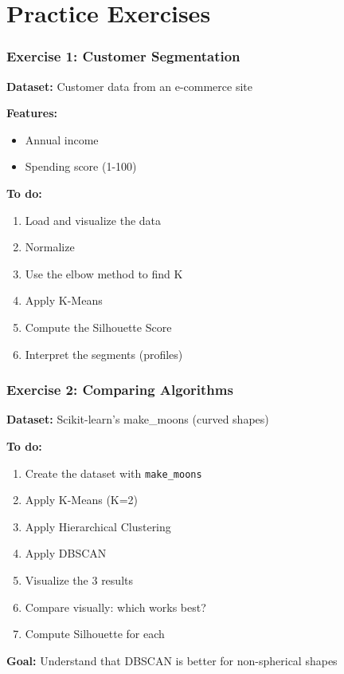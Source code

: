 \documentclass{beamer}
\begin{document}
\section{Practice Exercises}

\begin{frame}
\frametitle{Exercise 1: Customer Segmentation}
\textbf{Dataset:} Customer data from an e-commerce site

\vspace{0.5em}
\textbf{Features:}
\begin{itemize}
    \item Annual income
    \item Spending score (1-100)
\end{itemize}

\vspace{1em}
\textbf{To do:}
\begin{enumerate}
    \item Load and visualize the data
    \item Normalize
    \item Use the elbow method to find K
    \item Apply K-Means
    \item Compute the Silhouette Score
    \item Interpret the segments (profiles)
\end{enumerate}
\end{frame}

\begin{frame}
\frametitle{Exercise 2: Comparing Algorithms}
\textbf{Dataset:} Scikit-learn's make\_moons (curved shapes)

\vspace{1em}
\textbf{To do:}
\begin{enumerate}
    \item Create the dataset with \texttt{make\_moons}
    \item Apply K-Means (K=2)
    \item Apply Hierarchical Clustering
    \item Apply DBSCAN
    \item Visualize the 3 results
    \item Compare visually: which works best?
    \item Compute Silhouette for each
\end{enumerate}

\vspace{0.5em}
\textbf{Goal:} Understand that DBSCAN is better for non-spherical shapes
\end{frame}
\end{document}
